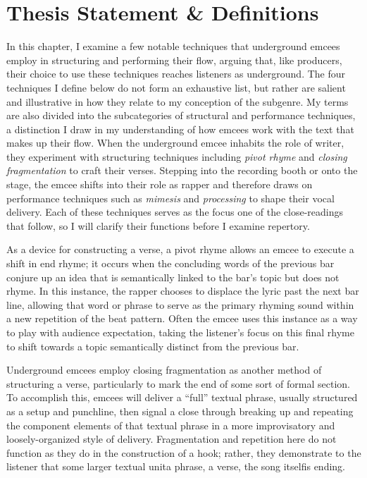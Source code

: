 \section{Thesis Statement \& Definitions}
In this chapter, I examine a few notable techniques that underground emcees employ in structuring
and performing their flow, arguing that, like producers, their choice to use these techniques reaches
listeners as underground. The four techniques I define below do not form an exhaustive list, but rather
are salient and illustrative in how they relate to my conception of the subgenre. My terms are also 
divided into the subcategories of structural and performance techniques, a distinction I draw in my 
understanding of how emcees work with the text that makes up their flow. When the underground emcee 
inhabits the role of writer, they experiment with structuring techniques including \emph{pivot rhyme} 
and \emph{closing fragmentation} to craft their verses. Stepping into the recording booth or onto the 
stage, the emcee shifts into their role as rapper and therefore draws on performance techniques such 
as \emph{mimesis} and \emph{processing} to shape their vocal delivery. Each of these techniques serves
as the focus one of the close-readings that follow, so I will clarify their functions before I examine
repertory.

As a device for constructing a verse, a pivot rhyme allows an emcee to execute a shift in end rhyme;
it occurs when the concluding words of the previous bar conjure up an idea that is semantically linked 
to the bar's topic but does not rhyme. In this instance, the rapper chooses to displace the lyric past
the next bar line, allowing that word or phrase to serve as the primary rhyming sound within a new repetition
of the beat pattern. Often the emcee uses this instance as a way to play with audience expectation, taking
the listener's focus on this final rhyme to shift towards a topic semantically distinct from the previous bar.

Underground emcees employ closing fragmentation as another method of structuring a verse, particularly
to mark the end of some sort of formal section. To accomplish this, emcees will deliver a ``full'' textual
phrase, usually structured as a setup and punchline, then signal a close through breaking up and repeating 
the component elements of that textual phrase in a more improvisatory and loosely-organized style of delivery.
Fragmentation and repetition here do not function as they do in the construction of a hook; rather, they
demonstrate to the listener that some larger textual unit\textemdash a phrase, a verse, the song 
itself\textemdash is ending.

